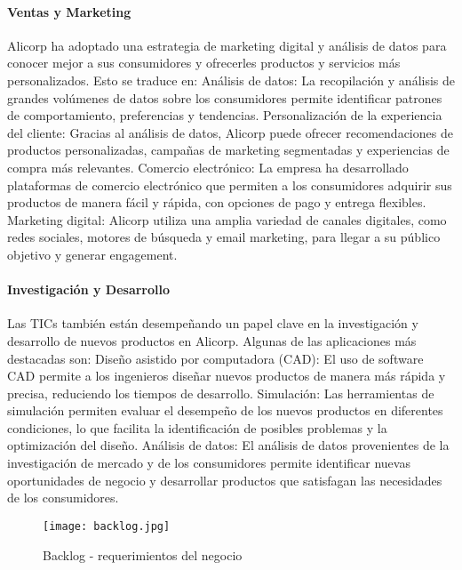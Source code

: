         \paragraph*{Ventas y Marketing} 
        Alicorp ha adoptado una estrategia de marketing digital y análisis de datos para conocer mejor a sus consumidores y ofrecerles productos y servicios más personalizados. Esto se traduce en: 
        Análisis de datos: La recopilación y análisis de grandes volúmenes de datos sobre los consumidores permite identificar patrones de comportamiento, preferencias y tendencias. 
        Personalización de la experiencia del cliente: Gracias al análisis de datos, Alicorp puede ofrecer recomendaciones de productos personalizadas, campañas de marketing segmentadas y experiencias de compra más relevantes. 
        Comercio electrónico: La empresa ha desarrollado plataformas de comercio electrónico que permiten a los consumidores adquirir sus productos de manera fácil y rápida, con opciones de pago y entrega flexibles. 
        Marketing digital: Alicorp utiliza una amplia variedad de canales digitales, como redes sociales, motores de búsqueda y email marketing, para llegar a su público objetivo y generar engagement. 
    
        \paragraph*{Investigación y Desarrollo}
        Las TICs también están desempeñando un papel clave en la investigación y desarrollo de nuevos productos en Alicorp. Algunas de las aplicaciones más destacadas son: 
        Diseño asistido por computadora (CAD): El uso de software CAD permite a los ingenieros diseñar nuevos productos de manera más rápida y precisa, reduciendo los tiempos de desarrollo. 
        Simulación: Las herramientas de simulación permiten evaluar el desempeño de los nuevos productos en diferentes condiciones, lo que facilita la identificación de posibles problemas y la optimización del diseño. 
        Análisis de datos: El análisis de datos provenientes de la investigación de mercado y de los consumidores permite identificar nuevas oportunidades de negocio y desarrollar productos que satisfagan las necesidades de los consumidores. 
        
        \begin{figure}[!ht]
            \centering
            \texttt{[image: backlog.jpg]}
            \caption{Backlog - requerimientos del negocio}
        \end{figure}
    \newpage
